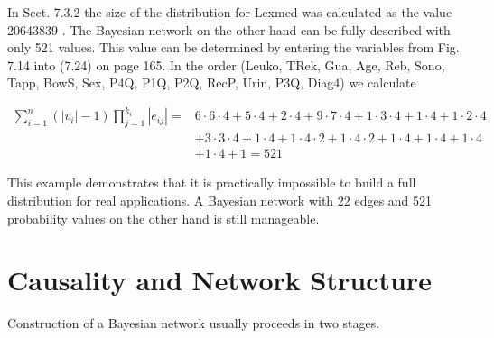 \documentclass[10pt]{article}
\begin{document}
In Sect. 7.3.2 the size of the distribution for Lexmed was calculated as the value 20643839 . The Bayesian network on the other hand can be fully described with only 521 values. This value can be determined by entering the variables from Fig. 7.14 into (7.24) on page 165. In the order (Leuko, TRek, Gua, Age, Reb, Sono, Tapp, BowS, Sex, P4Q, P1Q, P2Q, RecP, Urin, P3Q, Diag4) we calculate

$$
\begin{aligned}
\sum_{i=1}^{n}\left(\left|v_{i}\right|-1\right) \prod_{j=1}^{k_{i}}\left|e_{i j}\right|= & 6 \cdot 6 \cdot 4+5 \cdot 4+2 \cdot 4+9 \cdot 7 \cdot 4+1 \cdot 3 \cdot 4+1 \cdot 4+1 \cdot 2 \cdot 4 \\
& +3 \cdot 3 \cdot 4+1 \cdot 4+1 \cdot 4 \cdot 2+1 \cdot 4 \cdot 2+1 \cdot 4+1 \cdot 4+1 \cdot 4 \\
& +1 \cdot 4+1=521
\end{aligned}
$$

This example demonstrates that it is practically impossible to build a full distribution for real applications. A Bayesian network with 22 edges and 521 probability values on the other hand is still manageable.

\section*{Causality and Network Structure}
Construction of a Bayesian network usually proceeds in two stages.
\end{document}
